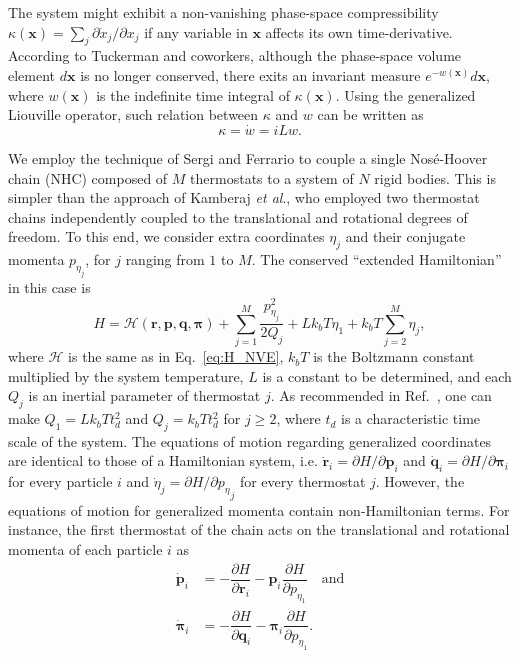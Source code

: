 \documentclass[aip,jcp,reprint,amsmath,amssymb]{revtex4-1}
\newcommand{\vt}[1]{\boldsymbol{\mathbf{#1}}}           %
\newcommand{\diff}[2]{\dfrac{\partial #1}{\partial #2}} %
\begin{document}
The system might exhibit a non-vanishing phase-space compressibility $\kappa(\vt x) = \sum_j \partial \dot{x}_j/\partial x_j$ if any variable in $\vt x$ affects its own time-derivative. According to Tuckerman and coworkers,\cite{Tuckerman_1999, Tuckerman2001} although the phase-space volume element $d\vt x$ is no longer conserved, there exits an invariant measure $e^{-w(\vt x)}d\vt x$, where $w(\vt x)$ is the indefinite time integral of $\kappa(\vt x)$. Using the generalized Liouville operator, such relation between $\kappa$ and $w$ can be written as
\begin{equation}
\label{eq:relation_kappa_w}
\kappa = \dot w = i\!L w.
\end{equation}

We employ the technique of Sergi and Ferrario\cite{Sergi2001} to couple a single Nos\'e-Hoover chain\cite{Martyna1992} (NHC) composed of $M$ thermostats to a system of $N$ rigid bodies. This is simpler than the approach of Kamberaj \textit{et al}.,\cite{Kamberaj2005} who employed two thermostat chains independently coupled to the translational and rotational degrees of freedom. To this end, we consider extra coordinates $\eta_j$ and their conjugate momenta $p_{\eta_j}$, for $j$ ranging from $1$ to $M$. The conserved ``extended Hamiltonian'' in this case is
\begin{equation}
\label{eq:H_nvt}
H = \mathcal{H}(\vt r,\vt p,\vt q,\vt \pi) + \sum_{j=1}^{M}\frac{p_{\eta_j}^2}{2Q_j} + L k_b T\eta_1 + k_b T\sum_{j=2}^M \eta_j,
\end{equation}
where $\mathcal H$ is the same as in Eq.~\eqref{eq:H_NVE}, $k_b T$ is the Boltzmann constant multiplied by the system temperature, $L$ is a constant to be determined, and each $Q_j$ is an inertial parameter of thermostat $j$. As recommended in Ref.~, one can make $Q_1 = L k_b T t_d^2$ and $Q_j = k_b T t_d^2$ for $j \geq 2$, where $t_d$ is a characteristic time scale of the system. The equations of motion regarding generalized coordinates are identical to those of a Hamiltonian system, i.e. $\dot{\vt r}_i = {\partial H}/{\partial \vt p_i}$ and $\dot{\vt q}_i = {\partial H}/{\partial \vt \pi_i}$ for every particle $i$ and $\dot{\eta}_j = {\partial H}/{\partial {p_\eta}_j}$ for every thermostat $j$. However, the equations of motion for generalized momenta contain non-Hamiltonian terms. For instance, the first thermostat of the chain acts on the translational and rotational momenta of each particle $i$ as
\[
\begin{split}
\dot{\vt p}_i &= -\diff{H}{\vt r_i} - {\vt p}_i \diff{H}{p_{\eta_1}} \quad \text{and} \\
\dot{\vt \pi}_i &= -\diff{H}{\vt q_i} - {\vt \pi}_i \diff{H}{p_{\eta_1}}.
\end{split}
\]
\end{document}
